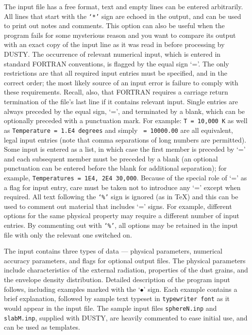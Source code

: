 \documentclass[12pt]{article} \usepackage{epsf}
\def\D  {{\sf DUSTY}}
\begin{document}
The input file has a free format, text and empty lines can be entered
arbitrarily. All lines that start with the {\tt `*'} sign are echoed in the
output, and can be used to print out notes and comments. This option can also
be useful when the program fails for some mysterious reason and you want to
compare its output with an exact copy of the input line as it was read in
before processing by \D. The occurrence of relevant numerical input, which is
entered in standard FORTRAN conventions, is flagged by the equal sign `='. The
only restrictions are that all required input entries must be specified, and in
the correct order; the most likely source of an input error is failure to
comply with these requirements.  Recall, also, that FORTRAN requires a carriage
return termination of the file's last line if it contains relevant input.
Single entries are always preceded by the equal sign, `=', and terminated by a
blank, which can be optionally preceded with a punctuation mark.  For example:
{\tt T = 10,000 K} as well as {\tt Temperature = 1.E4 degrees} and simply {\tt
{} = 10000.00} are all equivalent, legal input entries (note that comma
separations of long numbers are permitted).  Some input is entered as a list,
in which case the first member is preceded by `=' and each subsequent member
must be preceded by a blank (an optional punctuation can be entered before the
blank for additional separation); for example, {\tt Temperatures  = 1E4, 2E4
30,000}. Because of the special role of `=' as a flag for input entry, care
must be taken not to introduce any `=' except when required.  All text
following the {\tt `\%'} sign is ignored (as in \TeX) and this can be used to
comment out material that includes `=' signs.  For example, different options
for the same physical property may require a different number of input entries.
By commenting out with {\tt `\%'}, all options may be retained in the input
file with only the relevant one switched on.

The input contains three types of data --- physical parameters, numerical
accuracy parameters, and flags for optional output files.  The physical
parameters include characteristics of the external radiation, properties of the
dust grains, and the envelope density distribution.  Detailed description of
the program input follows, including examples marked with the `$\bullet$' sign.
Each example contains a brief explanation, followed by sample text typeset in
{\tt typewriter font} as it would appear in the input file. The sample input
files {\tt sphereN.inp} and {\tt slabM.inp}, supplied with \D, are heavily
commented to ease initial use, and can be used as templates.
\end{document}
